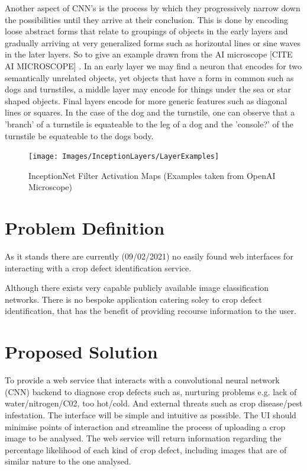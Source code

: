   \par
  Another aspect of CNN's is the process by which they progressively narrow down the possibilities until they arrive at their conclusion. This is done by encoding loose abstract forms that relate to groupings of objects in the early layers and gradually arriving at very generalized forms such as horizontal lines or sine waves in the later layers. So to give an example drawn from the AI microscope [CITE AI MICROSCOPE] . In an early layer  we may find a neuron that encodes for two semantically unrelated objects, yet objects that have a form in common such as dogs and turnstiles, a middle layer may encode for things under the sea or star shaped objects. Final layers encode for more generic features such as diagonal lines or squares. In the case of the dog and the turnstile, one can observe that a 'branch' of a turnstile is equateable to the leg of a dog and the 'console?' of the turnstile be equateable to the dogs body.
  \par

  \begin{landscape}
    \begin{figure}[H]
      \begin{center}
        \texttt{[image: Images/InceptionLayers/LayerExamples]}
        \caption{InceptionNet Filter Activation Maps (Examples taken from OpenAI Microscope)}
        \label{fig:inceptionNet_filter_activation}
      \end{center}
    \end{figure}
  \end{landscape}
  \par

  \newpage

\section{Problem Definition}
  As it stands there are currently (09/02/2021) no easily found  web interfaces for interacting with a crop defect identification service.
  \par
  Although there exists very capable publicly available image classification networks. \cite{Yandex} There is no bespoke application catering soley to crop defect identification, that has the benefit of providing recourse information to the user.

\section{Proposed Solution}
  To provide a web service that interacts with a convolutional neural network (CNN) backend to diagnose crop defects such as, nurturing problems e.g. lack of water/nitrogen/C02, too hot/cold. And external threats such as crop disease/pest infestation. The interface will be simple and intuitive as possible. The UI should minimise points of interaction and streamline the process of uploading a crop image to be analysed.
	The web service will return information regarding the percentage likelihood of each kind of crop defect, including images that are of similar nature to the one analysed.

